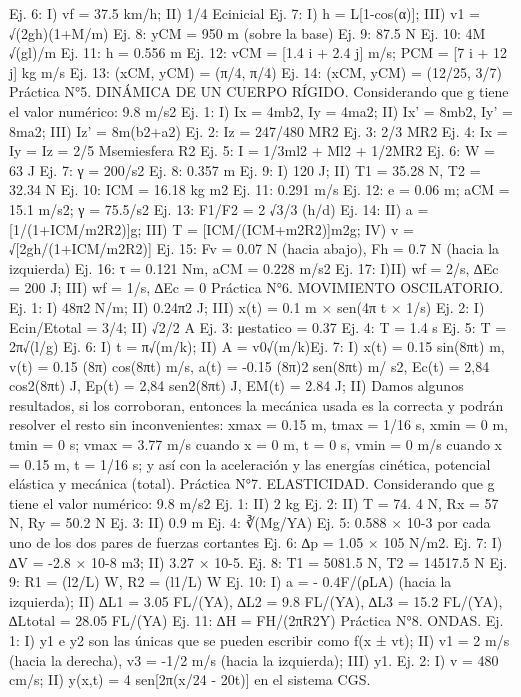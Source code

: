 Ej. 6: I) vf = 37.5 km/h; II) 1/4 Ecinicial
Ej. 7: I) h = L[1-cos(α)]; III) v1 = √(2gh)(1+M/m)
Ej. 8: yCM = 950 m (sobre la base)
Ej. 9: 87.5 N
Ej. 10: 4M √(gl)/m
Ej. 11: h = 0.556 m
Ej. 12: vCM = [1.4 i + 2.4 j] m/s; PCM = [7 i + 12 j] kg m/s
Ej. 13: (xCM, yCM) = (π/4, π/4)
Ej. 14: (xCM, yCM) = (12/25, 3/7)
Práctica N°5. DINÁMICA DE UN CUERPO RÍGIDO.
Considerando que g tiene el valor numérico: 9.8 m/s2
Ej. 1: I) Ix = 4mb2, Iy = 4ma2; II) Ix’ = 8mb2, Iy’ = 8ma2; III) Iz’ = 8m(b2+a2)
Ej. 2: Iz = 247/480 MR2
Ej. 3: 2/3 MR2
Ej. 4: Ix = Iy = Iz = 2/5 Msemiesfera R2
Ej. 5: I = 1/3ml2 + Ml2 + 1/2MR2
Ej. 6: W = 63 J
Ej. 7: γ = 200/s2
Ej. 8: 0.357 m
Ej. 9: I) 120 J; II) T1 = 35.28 N, T2 = 32.34 N
Ej. 10: ICM = 16.18 kg m2
Ej. 11: 0.291 m/s
Ej. 12: e = 0.06 m; aCM = 15.1 m/s2; γ = 75.5/s2
Ej. 13: F1/F2 = 2 √3/3 (h/d)
Ej. 14: II) a = [1/(1+ICM/m2R2)]g; III) T = [ICM/(ICM+m2R2)]m2g; IV) v = √[2gh/(1+ICM/m2R2)]
Ej. 15: Fv = 0.07 N (hacia abajo), Fh = 0.7 N (hacia la izquierda)
Ej. 16: τ = 0.121 Nm, aCM = 0.228 m/s2
Ej. 17: I)II) wf = 2/s, ∆Ec = 200 J; III) wf = 1/s, ∆Ec = 0
Práctica N°6. MOVIMIENTO OSCILATORIO.
Ej. 1: I) 48π2 N/m; II) 0.24π2 J; III) x(t) = 0.1 m × sen(4π t × 1/s)
Ej. 2: I) Ecin/Etotal = 3/4; II) √2/2 A
Ej. 3: μestatico = 0.37
Ej. 4: T = 1.4 s
Ej. 5: T = 2π√(l/g)
Ej. 6: I) t = π√(m/k); II) A = v0√(m/k)Ej. 7: I) x(t) = 0.15 sin(8πt) m, v(t) = 0.15 (8π) cos(8πt) m/s, a(t) = -0.15 (8π)2 sen(8πt) m/
s2, Ec(t) = 2,84 cos2(8πt) J, Ep(t) = 2,84 sen2(8πt) J, EM(t) = 2.84 J; II) Damos algunos
resultados, si los corroboran, entonces la mecánica usada es la correcta y podrán resolver
el resto sin inconvenientes: xmax = 0.15 m, tmax = 1/16 s, xmin = 0 m, tmin = 0 s; vmax = 3.77 m/s
cuando x = 0 m, t = 0 s, vmin = 0 m/s cuando x = 0.15 m, t = 1/16 s; y así con la aceleración y
las energías cinética, potencial elástica y mecánica (total).
Práctica N°7. ELASTICIDAD.
Considerando que g tiene el valor numérico: 9.8 m/s2
Ej. 1: II) 2 kg
Ej. 2: II) T = 74. 4 N, Rx = 57 N, Ry = 50.2 N
Ej. 3: II) 0.9 m
Ej. 4: ∛(Mg/YA)
Ej. 5: 0.588 × 10-3 por cada uno de los dos pares de fuerzas cortantes
Ej. 6: ∆p = 1.05 × 105 N/m2.
Ej. 7: I) ∆V = -2.8 × 10-8 m3; II) 3.27 × 10-5.
Ej. 8: T1 = 5081.5 N, T2 = 14517.5 N
Ej. 9: R1 = (l2/L) W, R2 = (l1/L) W
Ej. 10: I) a = - 0.4F/(ρLA) (hacia la izquierda); II) ∆L1 = 3.05 FL/(YA), ∆L2 = 9.8 FL/(YA),
∆L3 = 15.2 FL/(YA), ∆Ltotal = 28.05 FL/(YA)
Ej. 11: ∆H = FH/(2πR2Y)
Práctica N°8. ONDAS.
Ej. 1: I) y1 e y2 son las únicas que se pueden escribir como f(x ± vt); II) v1 = 2 m/s (hacia la
derecha), v3 = -1/2 m/s (hacia la izquierda); III) y1.
Ej. 2: I) v = 480 cm/s; II) y(x,t) = 4 sen[2π(x/24 - 20t)] en el sistema CGS.
